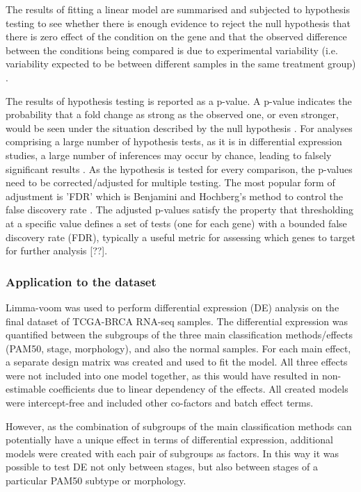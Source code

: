         The results of fitting a linear model are summarised and subjected to hypothesis testing to see whether there is enough evidence to reject the null hypothesis that there is zero effect of the condition on the gene and that the observed difference between the conditions being compared is due to experimental variability (i.e. variability expected to be between different samples in the same treatment group) \cite{Love2016RNA-SeqApproved}.
        
        The results of hypothesis testing is reported as a p-value. A p-value indicates the probability that a fold change as strong as the observed one, or even stronger, would be seen under the            situation described by the null hypothesis  \cite{Love2016RNA-SeqApproved}.  For analyses comprising a large number of hypothesis tests, as it is in differential expression studies, a large number of inferences may occur by chance, leading to falsely significant results \cite{pounds2006estimation}. As the hypothesis is tested for every comparison, the p-values need to be corrected/adjusted for multiple testing. The most popular form of adjustment is 'FDR' which is Benjamini and Hochberg’s method to control the false discovery rate \cite{BH1995}. The adjusted p-values satisfy the property that thresholding at a specific value defines a set of tests (one for each gene) with a bounded false discovery rate (FDR), typically a useful metric for assessing which genes to target for further analysis [??].



        \subsubsection{Application to the dataset}
        Limma-voom was used to perform differential expression (DE) analysis on the final dataset of TCGA-BRCA RNA-seq samples. The differential expression was quantified between the subgroups of the three main classification methods/effects (PAM50, stage, morphology), and also the normal samples. 
        For each main effect, a separate design matrix was created and used to fit the model. All three effects were not included into one model together, as this would have resulted in non-estimable coefficients due to linear dependency of the effects. All created models were intercept-free and included other co-factors and batch effect terms. 
        
        However, as the combination of subgroups of the main classification methods can potentially have a unique effect in terms of differential expression, additional models were created with each pair of subgroups as factors. In this way it was possible to test DE not only between stages, but also between stages of a particular PAM50 subtype or morphology. 
        

